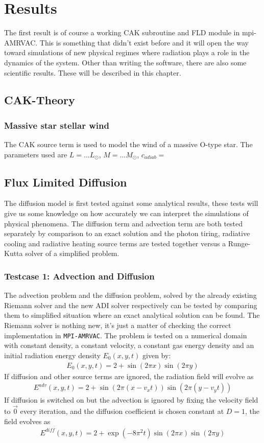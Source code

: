 \chapter{Results}
The first result is of course a working CAK subroutine and FLD module in mpi-AMRVAC. This is something that didn't exist before and it will open the way toward simulations of new physical regimes where radiation plays a role in the dynamics of the system. Other than writing the software, there are also some scientific results. These will be described in this chapter.

\section{CAK-Theory}
\subsection{Massive star stellar wind}
The CAK source term is used to model the wind of a massive O-type star. The parameters used are $L = ... L_\odot$, $M = ... M_\odot$, $c_{adiab} =$ 


\section{Flux Limited Diffusion}
The diffusion model is first tested against some analytical results, these tests will give us some knowledge on how accurately we can interpret the simulations of physical phenomena. The diffusion term and advection term are both tested separately by comparison to an exact solution and the photon tiring, radiative cooling and radiative heating source terms are tested together versus a Runge-Kutta solver of a simplified problem.

\subsection{Testcase 1: Advection and Diffusion}
The advection problem and the diffusion problem, solved by the already existing Riemann solver and the new ADI solver respectively can be tested by comparing them to simplified situation where an exact analytical solution can be found. The Riemann solver is nothing new, it's just a matter of checking the correct implementation in \texttt{MPI-AMRVAC}. The problem is tested on a numerical domain with constant density, a constant velocity, a constant gas energy density and an initial radiation energy density $E_0(x,y,t)$ given by:
\begin{align}
E_0(x,y,t) = 2 + \sin(2 \pi x) \sin(2 \pi y)
\end{align}
If diffusion and other source terms are ignored, the radiation field will evolve as
\begin{align}
E^{adv}(x,y,t) = 2 + \sin(2 \pi (x-v_x t)) \sin(2 \pi (y-v_y t))
\end{align}
If diffusion is switched on but the advection is ignored by fixing the velocity field to $\vec{0}$ every iteration, and the diffusion coefficient is chosen constant at $D = 1$, the field evolves as
\begin{align}
E^{diff}(x,y,t) = 2 + \exp(-8 \pi^2 t) \sin(2 \pi x) \sin(2 \pi y)
\end{align}

